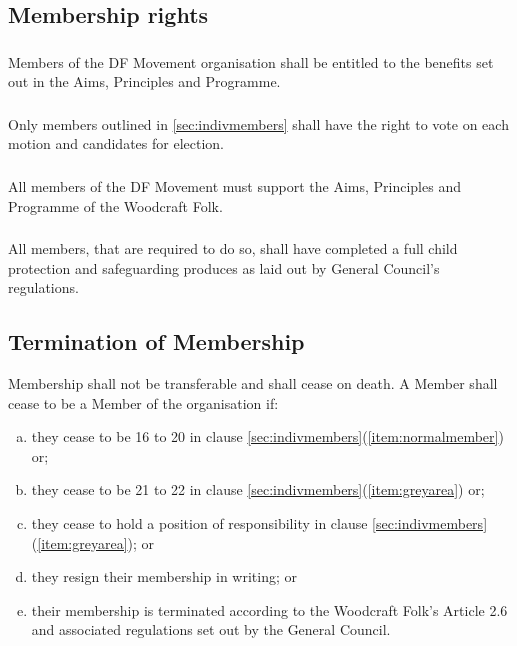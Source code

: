 \documentclass[a4paper, 12pt]{report}
\begin{document}

\subsection{Membership rights}
\subsubsection{}
Members of the DF Movement organisation shall be entitled to the benefits set out in the Aims, Principles and Programme.
\subsubsection{}
Only members outlined in \ref{sec:indivmembers} shall have the right to vote on each motion and
candidates for election.
\subsubsection{}
All members of the DF Movement must support the Aims, Principles and Programme of the Woodcraft Folk.
\subsubsection{}
All members, that are required to do so, shall have completed a full child protection and safeguarding produces as laid out by General Council's regulations.

\subsection{Termination of Membership}
Membership shall not be transferable and shall cease on death. A Member shall cease to be
a Member of the organisation if:
\begin{enumerate}[(a)]
\item they cease to be 16 to 20 in clause \ref{sec:indivmembers}(\ref{item:normalmember}) or;
\item they cease to be 21 to 22 in clause \ref{sec:indivmembers}(\ref{item:greyarea}) or;
\item they cease to hold a position of responsibility in clause \ref{sec:indivmembers}(\ref{item:greyarea}); or
\item they resign their membership in writing; or
\item their membership is terminated according to the Woodcraft Folk's Article 2.6 and associated regulations set out by the General Council.
\end{enumerate}
\end{document}
